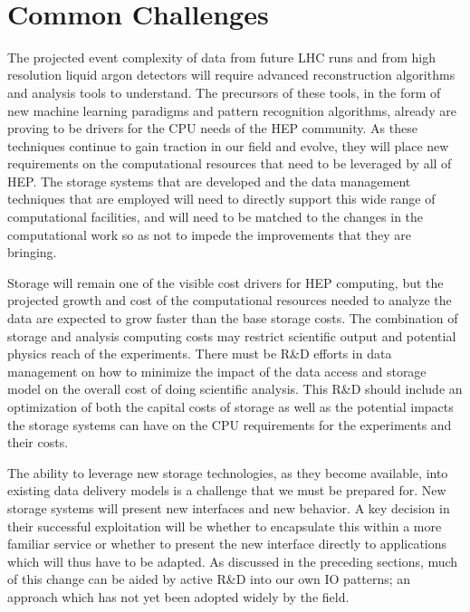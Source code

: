 \documentclass[12pt,a4paper]{article}
\begin{document}
~

\section{Common Challenges}\label{common-challenges}

The projected event complexity of data from future LHC runs and from
high resolution liquid argon detectors will require advanced
reconstruction algorithms and analysis tools to understand. The
precursors of these tools, in the form of new machine learning paradigms
and pattern recognition algorithms, already are proving to be drivers
for the CPU needs of the HEP community. As these techniques continue to
gain traction in our field and evolve, they will place new requirements on the computational
resources that need to be leveraged by all of HEP. The storage systems
that are developed and the data management techniques that are employed
will need to directly support this wide range of computational
facilities, and will need to be matched to the changes in the
computational work so as not to impede the improvements that they are
bringing.

Storage will remain one of the visible cost drivers for HEP computing,
but the projected growth and cost of the computational resources needed
to analyze the data are expected to grow faster than the base storage
costs. The combination of storage and analysis computing costs may
restrict scientific output and potential physics reach of the
experiments. There must be R\&D efforts in data management on how to
minimize the impact of the data access and storage model on the overall
cost of doing scientific analysis. This R\&D should include an
optimization of both the capital costs of storage as well as the
potential impacts the storage systems can have on the CPU requirements
for the experiments and their costs.

The ability to leverage new storage technologies, as they become
available, into existing data delivery models is a challenge that we must
be prepared for. New storage systems will present new interfaces and new
behavior. A key decision in their successful exploitation will be
whether to encapsulate this within a more familiar service or whether to
present the new interface directly to applications which will thus have
to be adapted. As discussed in the preceding sections, much of this
change can be aided by active R\&D into our own IO patterns; an approach
which has not yet been adopted widely by the field.
\end{document}
